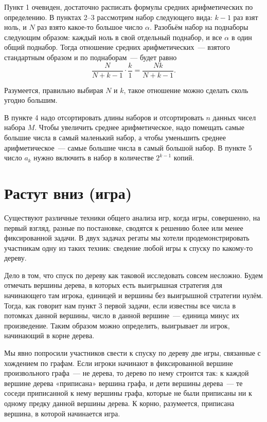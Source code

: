 \documentclass[a4paper,11pt]{article}
\begin{document}
Пункт 1 очевиден, достаточно расписать формулы средних арифметических по определению. В пунктах 2–3 рассмотрим набор следующего вида: \( k-1 \) раз взят ноль, и \( N \) раз взято какое-то большое число \( \alpha \). Разобьём набор на поднаборы следующим образом: каждый ноль в свой отдельный поднабор, и все \( \alpha \) в один общий поднабор. Тогда отношение средних арифметических~— взятого стандартным образом и по поднаборам~— будет равно \[ \frac{N}{N+k-1} \cdot \frac{k}{1} = \frac{Nk}{N+k-1}. \]

Разумеется, правильно выбирая \( N \) и \( k \), такое отношение можно сделать сколь угодно большим.

В пункте 4 надо отсортировать длины наборов и отсортировать \( n \) данных чисел набора \( M \). Чтобы увеличить среднее арифметическое, надо помещать самые большие числа в самый маленький набор, а чтобы уменьшить среднее арифметическое~— самые большие числа в самый большой набор. В пункте 5 число \( a_k \) нужно включить в набор в количестве \( 2^{k-1} \) копий.

\section{Растут вниз (игра)}

Существуют различные техники общего анализа игр, когда игры, совершенно, на первый взгляд, разные по постановке, сводятся к решению более или менее фиксированной задачи. В двух задачах регаты мы хотели продемонстрировать участникам одну из таких техник: сведение любой игры к спуску по какому-то дереву.

Дело в том, что спуск по дереву как таковой исследовать совсем несложно. Будем отмечать вершины дерева, в которых есть выигрышная стратегия для начинающего там игрока, единицей и вершины без выигрышной стратегии нулём. Тогда, как говорит нам пункт 3 первой задачи, если известны все числа в потомках данной вершины, число в данной вершине~— единица минус их произведение. Таким образом можно определить, выигрывает ли игрок, начинающий в корне дерева.

Мы явно попросили участников свести к спуску по дереву две игры, связанные с хождением по графам. Если игроки начинают в фиксированной вершине произвольного графа~— не дерева, то дерево по нему строится так: к каждой вершине дерева «приписана» вершина графа, и дети вершины дерева~— те соседи приписанной к нему вершины графа, которые не были приписаны ни к одному предку данной вершины дерева. К корню, разумеется, приписана вершина, в которой начинается игра.
\end{document}
